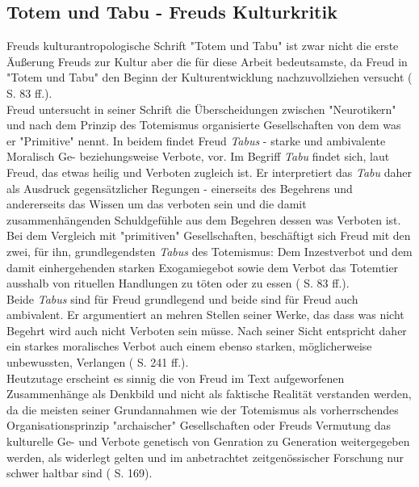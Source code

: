 \documentclass[11pt,a4paper,oneside,numbers=noenddot,bibliography=totocnumbered,DIV=13]{scrartcl}
\begin{document}
\subsection{Totem und Tabu - Freuds Kulturkritik} 
Freuds kulturantropologische Schrift "Totem und Tabu" ist zwar nicht die erste Äußerung Freuds zur Kultur aber die für diese Arbeit bedeutsamste, da Freud in "Totem und Tabu" den Beginn der Kulturentwicklung nachzuvollziehen versucht ({\cite{berkel_sigmund_2008} S. 83 ff.). \\
Freud untersucht in seiner Schrift die Überscheidungen zwischen "Neurotikern" und nach dem Prinzip des Totemismus organisierte Gesellschaften von dem was er "Primitive" nennt. In beidem findet Freud \textit{Tabus} - starke und ambivalente Moralisch Ge- beziehungsweise Verbote, vor. Im Begriff \textit{Tabu} findet sich, laut Freud, das etwas heilig und Verboten zugleich ist. Er interpretiert das \textit{Tabu} daher als Ausdruck gegensätzlicher Regungen - einerseits des Begehrens und andererseits das Wissen um das verboten sein und die damit zusammenhängenden Schuldgefühle aus dem Begehren dessen was Verboten ist. Bei dem Vergleich mit "primitiven" Gesellschaften, beschäftigt sich Freud mit den zwei, für ihn, grundlegendsten \textit{Tabus} des Totemismus: Dem Inzestverbot und dem damit einhergehenden starken Exogamiegebot sowie dem Verbot das Totemtier ausshalb von rituellen Handlungen zu töten oder zu essen (\cite{berkel_sigmund_2008} S. 83 ff.).\\
Beide \textit{Tabus} sind für Freud grundlegend und beide sind für Freud auch ambivalent. Er argumentiert an mehren Stellen seiner Werke, das dass was nicht Begehrt wird auch nicht Verboten sein müsse. Nach seiner Sicht entspricht daher ein starkes moralisches Verbot auch einem ebenso starken, möglicherweise unbewussten, Verlangen (\cite{lohmann_freud-handbuch:_2013} S. 241 ff.).\\
Heutzutage erscheint es sinnig  die von Freud im Text aufgeworfenen Zusammenhänge als Denkbild und nicht als faktische Realität verstanden werden, da die meisten seiner Grundannahmen wie der Totemismus als vorherrschendes Organisationsprinzip "archaischer" Gesellschaften oder Freuds Vermutung das  kulturelle Ge- und Verbote genetisch von Genration zu Generation weitergegeben werden, als widerlegt gelten und im anbetrachtet zeitgenössischer Forschung nur schwer haltbar sind (\cite{lohmann_freud-handbuch:_2013} S. 169).\\
}
\end{document}
